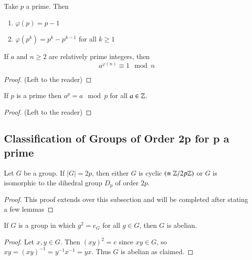 \documentclass[12pt, a4paper, oneside, openright, titlepage]{book}
\begin{document}
\begin{eg}
        Take $p$ a prime. Then \begin{enumerate}
                \item $\varphi(p) = p-1$
                \item $\varphi(p^k) = p^k - p^{k-1}$ for all $k \geq 1$
        \end{enumerate}
\end{eg}


\begin{namthm}
        If $a$ and $n \geq 2$ are relatively prime integers, then \begin{equation}
                a^{\varphi(n)} \equiv 1 \mod n
        \end{equation}
\end{namthm}
\begin{proof}
        (Left to the reader)
\end{proof}

\begin{namthm}
        If $p$ is a prime then $a^p = a \mod p$ for all $a \in \mathbb Z$.
\end{namthm}
\begin{proof}
        (Left to the reader)
\end{proof}

\subsection{\textsection Classification of Groups of Order 2p for p a prime}

\begin{thm}
        Let $G$ be a group. If $|G| = 2p$, then either $G$ is cyclic $(\cong \mathbb Z/2p\mathbb Z)$ or $G$ is isomorphic to the dihedral group $D_p$ of order $2p$.
\end{thm}
\begin{proof}
        This proof extends over this subsection and will be completed after stating a few lemmas
\end{proof}


\begin{lem}
        If $G$ is a group in which $g^2 = e_G$ for all $g \in G$, then $G$ is abelian.
\end{lem}
\begin{proof}
        Let $x,y \in G$. Then $(xy)^2 = e$ since $xy \in G$, so $xy = (xy)^{-1} = y^{-1}x^{-1} = yx$. Thus $G$ is abelian as claimed.
\end{proof}
\end{document}
